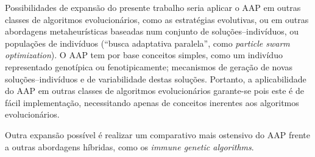 \documentclass[relatorio,nocolorlinks]{inf-ufg}
\begin{document}
Possibilidades de expans\~{a}o do presente trabalho seria aplicar o AAP em outras classes de algoritmos evolucion\'{a}rios, como as estrat\'{e}gias
evolutivas, ou em outras abordagens metaheur\'{i}sticas baseadas num conjunto de solu\c{c}\~{o}es--indiv\'{i}duos, ou popula\c{c}\~{o}es de
indiv\'{i}duos (``busca adaptativa paralela'', como \textit{particle swarm optimization}). O AAP tem por base conceitos simples, como um indiv\'{i}duo
representado genot\'{i}pica ou fenotipicamente; mecanismos de gera\c{c}\~{a}o de novas solu\c{c}\~{o}es--indiv\'{i}duos e de variabilidade destas
solu\c{c}\~{o}es. Portanto, a aplicabilidade do AAP em outras classes de algoritmos evolucion\'{a}rios garante-se pois este \'{e} de f\'{a}cil
implementa\c{c}\~{a}o, necessitando apenas de conceitos inerentes aos algoritmos evolucion\'{a}rios.

Outra expans\~{a}o poss\'{i}vel \'{e} realizar um comparativo mais ostensivo do AAP frente a outras abordagens h\'{i}bridas, como os
\textit{immune genetic algorithms}.

\cleardoublepage
\nocite{*}
\arial


\apendices
\end{document}

